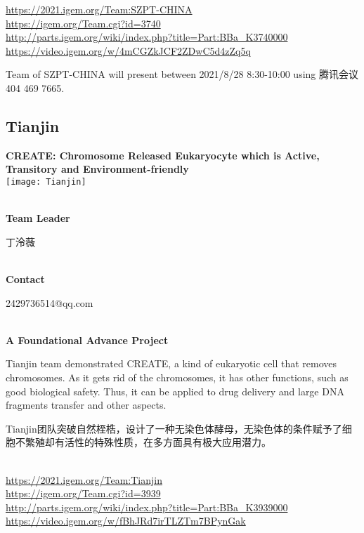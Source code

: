 \url{https://2021.igem.org/Team:SZPT-CHINA }\\
\url{https://igem.org/Team.cgi?id=3740 }\\
\url{http://parts.igem.org/wiki/index.php?title=Part:BBa_K3740000 }\\
\url{https://video.igem.org/w/4mCGZkJCF2ZDwC5d4zZq5q }\\

\vfill{}









Team of SZPT-CHINA will present between    2021/8/28 8:30-10:00     using 腾讯会议 404 469 7665.
\newpage


\subsection{\textcolor{Blu}{ Tianjin } }
\vspace{5mm}
\begin{center}
\large{
  \textbf{ CREATE: Chromosome Released Eukaryocyte which is Active, Transitory and Environment-friendly }\\
  \texttt{[image: Tianjin]}
}
\end{center}
\textbf{\\Team Leader}

  丁泠薇


\textbf{\\Contact}

  2429736514@qq.com


\textbf{\\A Foundational Advance Project\\}\begin{spacing}{1.5}

Tianjin team demonstrated CREATE, a kind of eukaryotic cell that removes chromosomes. As it gets rid of the chromosomes, it has other functions, such as good biological safety. Thus, it can be applied to drug delivery and large DNA fragments transfer and other aspects.

Tianjin团队突破自然桎梏，设计了一种无染色体酵母，无染色体的条件赋予了细胞不繁殖却有活性的特殊性质，在多方面具有极大应用潜力。\end{spacing}
\\

\url{https://2021.igem.org/Team:Tianjin }\\
\url{https://igem.org/Team.cgi?id=3939 }\\
\url{http://parts.igem.org/wiki/index.php?title=Part:BBa_K3939000 }\\
\url{https://video.igem.org/w/fBhJRd7irTLZTm7BPynGak }\\

